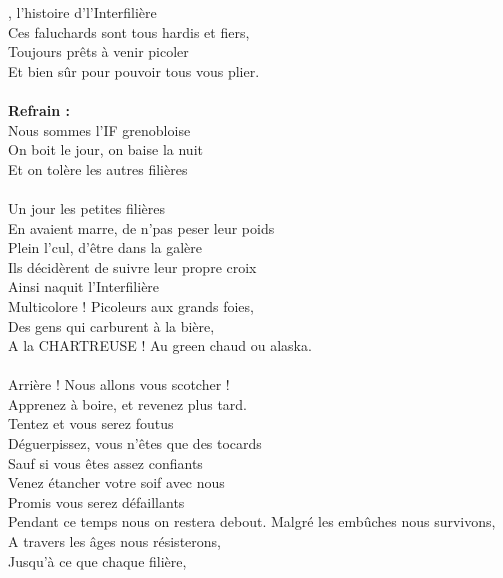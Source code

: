 
, l'histoire d'l'Interfilière
\\Ces faluchards sont tous hardis et fiers,
\\Toujours prêts à venir picoler
\\Et bien sûr pour pouvoir tous vous plier.
\\\\\textbf{Refrain :}
\\Nous sommes l'IF grenobloise
\\On boit le jour, on baise la nuit
\\Et on tolère les autres filières
\\\\Un jour les petites filières
\\En avaient marre, de n'pas peser leur poids
\\Plein l'cul, d'être dans la galère
\\Ils décidèrent de suivre leur propre croix
\\Ainsi naquit l'Interfilière
\\Multicolore ! Picoleurs aux grands foies,
\\Des gens qui carburent à la bière,
\\A la CHARTREUSE ! Au green chaud ou alaska.
\\\\Arrière ! Nous allons vous scotcher !
\\Apprenez à boire, et revenez plus tard.
\\Tentez et vous serez foutus
\\Déguerpissez, vous n'êtes que des tocards
\\Sauf si vous êtes assez confiants
\\Venez étancher votre soif avec nous
\\Promis vous serez défaillants
\\Pendant ce temps nous on restera debout.
\breakpage
Malgré les embûches nous survivons,
\\A travers les âges nous résisterons,
\\Jusqu'à ce que chaque filière,
